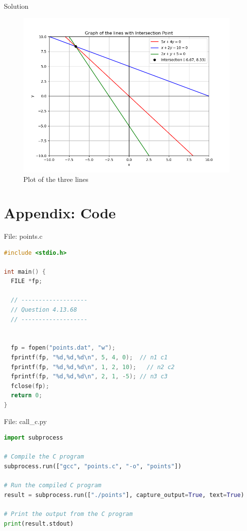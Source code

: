 \documentclass{beamer}
\numberwithin{equation}{section}
\theoremstyle{remark}
\begin{document}
\begin{frame}{Solution}
\begin{figure}[h!]
   \centering
   \includegraphics[width=0.8\linewidth]{figs/01.png}
   \caption{Plot of the three lines}
   \label{Plot_1}
\end{figure}
\end{frame}

\section*{Appendix: Code}

\begin{frame}[fragile]{File: points.c}
\begin{lstlisting}[language=C]
#include <stdio.h>

int main() {
  FILE *fp;

  // -------------------
  // Question 4.13.68
  // -------------------


  fp = fopen("points.dat", "w");
  fprintf(fp, "%d,%d,%d\n", 5, 4, 0);  // n1 c1
  fprintf(fp, "%d,%d,%d\n", 1, 2, 10);   // n2 c2
  fprintf(fp, "%d,%d,%d\n", 2, 1, -5); // n3 c3
  fclose(fp);
  return 0;
}
\end{lstlisting}
\end{frame}

\begin{frame}[fragile]{File: call\_c.py}
\begin{lstlisting}[language=Python]
import subprocess

# Compile the C program
subprocess.run(["gcc", "points.c", "-o", "points"])

# Run the compiled C program
result = subprocess.run(["./points"], capture_output=True, text=True)

# Print the output from the C program
print(result.stdout)
\end{lstlisting}
\end{frame}
\end{document}
